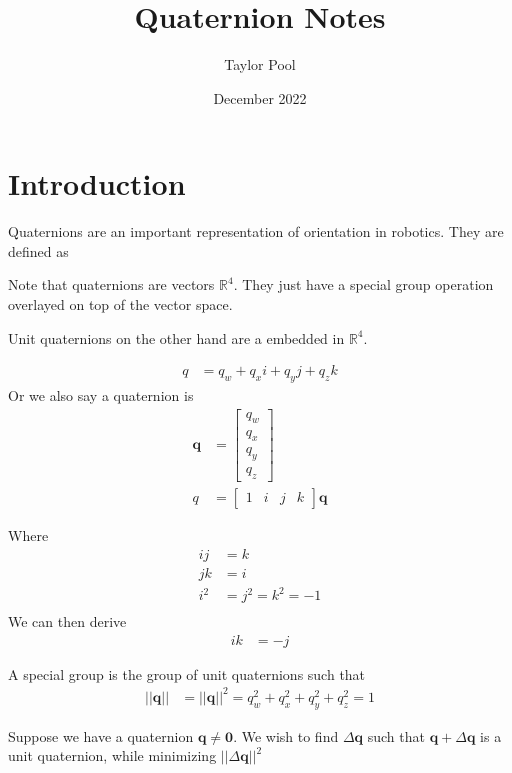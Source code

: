 \documentclass{article}
\title{Quaternion Notes}
\author{Taylor Pool}
\date{December 2022}
\begin{document}
\maketitle

\section{Introduction}

Quaternions are an important representation of orientation in robotics. They are defined as

Note that quaternions are vectors $\mathbb{R}^4$. They just have a special group operation overlayed on top of the vector space.

Unit quaternions on the other hand are a  embedded in $\mathbb{R}^4$.

\begin{align*}
	q & = q_w + q_x i + q_y j + q_z k
\end{align*}
Or we also say a quaternion is
\begin{align*}
	\pmb{q} & = \begin{bmatrix}
		            q_w \\
		            q_x \\
		            q_y \\
		            q_z
	            \end{bmatrix}        \\
	q       & = \begin{bmatrix}
		            1 & i & j & k
	            \end{bmatrix} \pmb{q}
\end{align*}

Where
\begin{align*}
	ij  & = k              \\
	jk  & = i              \\
	i^2 & = j^2 = k^2 = -1 \\
\end{align*}
We can then derive
\begin{align*}
	ik & = -j
\end{align*}

A special group is the group of unit quaternions such that
\begin{align*}
	|| \pmb{q} || & = || \pmb{q} ||^2 = q_w^2 + q_x^2 + q_y^2 + q_z^2 = 1
\end{align*}

Suppose we have a quaternion $\pmb{q} \ne \pmb{0}$. We wish to find $\Delta \pmb{q}$ such that $\pmb{q} + \Delta \pmb{q} $ is a unit quaternion, while minimizing $||\Delta \pmb{q}||^2$
\end{document}
